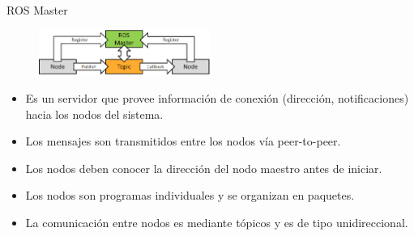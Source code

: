 \documentclass[24pt,aspectratio=169]{beamer}
\begin{document}
\begin{frame}{ROS Master}
  \begin{figure}
    \centering
    \includegraphics[width=0.5\textwidth]{ros_master}
  \end{figure}
  
  \begin{itemize}
    \item Es un servidor que provee información de conexión (dirección, notificaciones) hacia los nodos del sistema.
    \item Los mensajes son transmitidos entre los nodos vía peer-to-peer.
    \item Los nodos deben conocer la dirección del nodo maestro antes de iniciar.
    \item Los nodos son programas individuales y se organizan en paquetes.
    \item La comunicación entre nodos es mediante tópicos y es de tipo unidireccional.
  \end{itemize}
\end{frame}
\end{document}
